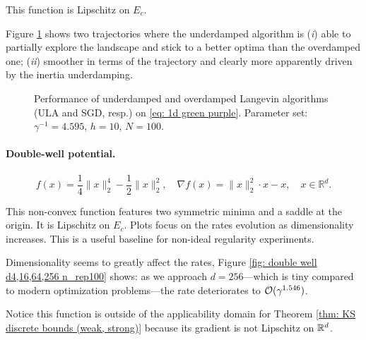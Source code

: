 \documentclass[12pt]{article}
\begin{document}
This function is Lipschitz on $E_c$.

Figure \ref{fig: green purple 1d} shows two trajectories where the underdamped algorithm is (\textit{i}) able to partially explore the landscape and stick to a better optima than the overdamped one; (\textit{ii}) smoother in terms of the trajectory and clearly more apparently driven by the inertia underdamping.

\begin{figure}[!htbp]
    \centering
    \begin{minipage}{0.48\textwidth}
        \centering
    \end{minipage}\hfill
    \begin{minipage}{0.48\textwidth}
        \centering
    \end{minipage}
    \caption{Performance of underdamped and overdamped Langevin algorithms (ULA and SGD, resp.) on \eqref{eq: 1d green purple}. Parameter set: $\gamma^{-1}=4.595$, $h=10$, $N=100$.}
    \label{fig: green purple 1d}
\end{figure}


\paragraph{Double-well potential.}
\label{par: double well}
\[
    f(x) = \frac{1}{4}\|x\|_2^{4} - \frac{1}{2}\|x\|_2^{2},\quad \nabla f(x) = \|x\|_2^{2}\cdot x - x, \quad x \in \mathbb{R}^d.
\]

This non-convex function features two symmetric minima and a saddle at the origin.
It is Lipschitz on $E_c$.
Plots focus on the rates evolution as dimensionality increases.
This is a useful baseline for non-ideal regularity experiments.

Dimensionality seems to greatly affect the rates, Figure \ref{fig: double well d4,16,64,256 n_rep100} shows: as we approach $d=256$---which is tiny compared to modern optimization problems---the rate deteriorates to $\mathcal{O}(\gamma^{1.546})$.

Notice this function is outside of the applicability domain for Theorem \ref{thm: KS discrete bounds (weak, strong)} because its gradient is not Lipschitz on ${\mathbb{R}}^d$.
\end{document}
